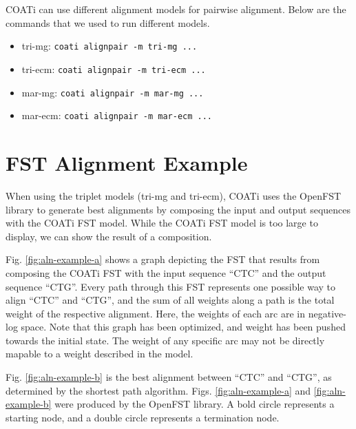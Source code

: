 \documentclass[
]{article}
\providecommand{\tightlist}{%
  \setlength{\itemsep}{0pt}\setlength{\parskip}{0pt}}
\begin{document}
COATi can use different alignment models for pairwise alignment. Below are the commands that we used to run different models.

\begin{itemize}
\tightlist
\item
  tri-mg: \texttt{coati\ alignpair\ -m\ tri-mg\ ...}
\item
  tri-ecm: \texttt{coati\ alignpair\ -m\ tri-ecm\ ...}
\item
  mar-mg: \texttt{coati\ alignpair\ -m\ mar-mg\ ...}
\item
  mar-ecm: \texttt{coati\ alignpair\ -m\ mar-ecm\ ...}
\end{itemize}

\hypertarget{fst-alignment-example}{%
\section{FST Alignment Example}\label{fst-alignment-example}}

When using the triplet models (tri-mg and tri-ecm), COATi uses the OpenFST library to generate best alignments by composing the input and output sequences with the COATi FST model. While the COATi FST model is too large to display, we can show the result of a composition.

Fig. \ref{fig:aln-example-a} shows a graph depicting the FST that results from composing the COATi FST with the input sequence ``CTC'' and the output sequence ``CTG''. Every path through this FST represents one possible way to align ``CTC'' and ``CTG'', and the sum of all weights along a path is the total weight of the respective alignment. Here, the weights of each arc are in negative-log space. Note that this graph has been optimized, and weight has been pushed towards the initial state. The weight of any specific arc may not be directly mapable to a weight described in the model.

Fig. \ref{fig:aln-example-b} is the best alignment between ``CTC'' and ``CTG'', as determined by the shortest path algorithm. Figs. \ref{fig:aln-example-a} and \ref{fig:aln-example-b} were produced by the OpenFST library. A bold circle represents a starting node, and a double circle represents a termination node.
\end{document}
